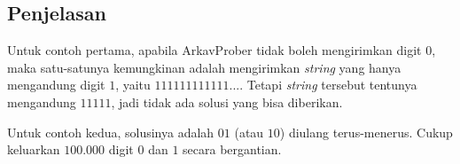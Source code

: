 \documentclass{article}
\begin{document}
\subsection*{Penjelasan}

Untuk contoh pertama, apabila ArkavProber tidak boleh mengirimkan digit $0$, maka satu-satunya kemungkinan adalah mengirimkan \textit{string} yang hanya mengandung digit $1$, yaitu $111111111111...$. Tetapi \textit{string} tersebut tentunya mengandung $11111$, jadi tidak ada solusi yang bisa diberikan.

Untuk contoh kedua, solusinya adalah $01$ (atau $10$) diulang terus-menerus. Cukup keluarkan $100.000$ digit $0$ dan $1$ secara bergantian.

\pagebreak
\end{document}

